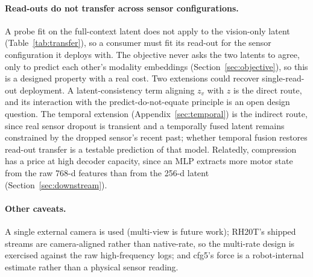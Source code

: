 \documentclass{article}
\begin{document}
\paragraph{Read-outs do not transfer across sensor configurations.} A probe fit on the full-context latent does not apply to the vision-only latent (Table~\ref{tab:transfer}), so a consumer must fit its read-out for the sensor configuration it deploys with. The objective never asks the two latents to agree, only to predict each other's modality embeddings (Section~\ref{sec:objective}), so this is a designed property with a real cost. Two extensions could recover single-read-out deployment. A latent-consistency term aligning $z_v$ with $z$ is the direct route, and its interaction with the predict-do-not-equate principle is an open design question. The temporal extension (Appendix~\ref{sec:temporal}) is the indirect route, since real sensor dropout is transient and a temporally fused latent remains constrained by the dropped sensor's recent past; whether temporal fusion restores read-out transfer is a testable prediction of that model. Relatedly, compression has a price at high decoder capacity, since an MLP extracts more motor state from the raw 768-d features than from the 256-d latent (Section~\ref{sec:downstream}).

\paragraph{Other caveats.} A single external camera is used (multi-view is future work); RH20T's shipped streams are camera-aligned rather than native-rate, so the multi-rate design is exercised against the raw high-frequency logs; and cfg5's force is a robot-internal estimate rather than a physical sensor reading.
\end{document}

